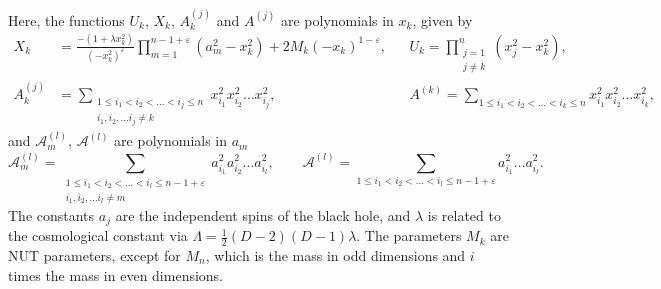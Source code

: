 Here, the functions $U_{k}$, $X_{k}$, $A_{k}^{(j)}$ and $A^{(j)}$ are
polynomials in $x_{k}$, given by
%
\begin{align}  \nonumber
        X_{k} &= \frac{-(1 + \lambda x_{k}^{2})}{(-x_{k}^{2})^{\varepsilon}} \prod_{m = 1}^{n - 1 +
        \varepsilon}(a_{m}^{2} - x_{k}^{2}) + 2 M_{k} (-x_{k})^{1 - \varepsilon}, & &U_{k} = \prod_{ \substack{j = 1 \\ j \neq k}}^{n} (x_{j}^{2} - x_{k}^{2}), \\
        A_{k}^{(j)} &= \sum_{ \substack{1 \leq i_{1} < i_{2} < \dots < i_{j} \leq n \\ i_{1}, i_{2},
        \dots i_{j} \neq k}}^{} x_{i_{1}}^{2} x_{i_{2}}^{2} \dots x_{i_{j}}^{2},& &A^{(k)}
        = \sum_{1 \leq i_{1} < i_{2} < \dots < i_{k} \leq n}^{}x_{i_{1}}^{2} x_{i_{2}}^{2} \dots
        x^{2}_{i_{k}},\label{5D:KNAmetricFunctions} 
\end{align}
%
and $\mathcal{A}_{m}^{(l)}$, $\mathcal{A}^{(l)}$ are polynomials in $a_{m}$
%
\begin{equation} \label{5D:KNAspinPolynomials} 
    \mathcal{A}_{m}^{(l)} = \sum_{ \substack{1 \leq i_{1} < i_{2} < \dots < i_{l} \leq n-1+\varepsilon \\ i_{1}, i_{2},
        \dots i_{l} \neq m}}^{} a_{i_{1}}^{2} a_{i_{2}}^{2} \dots a_{i_{l}}^{2},
        \qquad \mathcal{A}^{(l)} = \sum_{1 \leq i_{1} < i_{2} < \dots < i_{l} \leq n - 1 + \varepsilon}^{} a_{i_{1}}^{2} \dots a_{i_{l}}^{2}.
\end{equation}
%
The constants $a_{j}$ are the independent spins of the black hole, and $\lambda$ is related to the cosmological
constant via $\Lambda = \frac{1}{2}(D-2)(D-1) \lambda$. The parameters $M_{k}$ are NUT parameters, except for
$M_{n}$, which is the mass in odd dimensions and $i$ times the mass in even dimensions.


